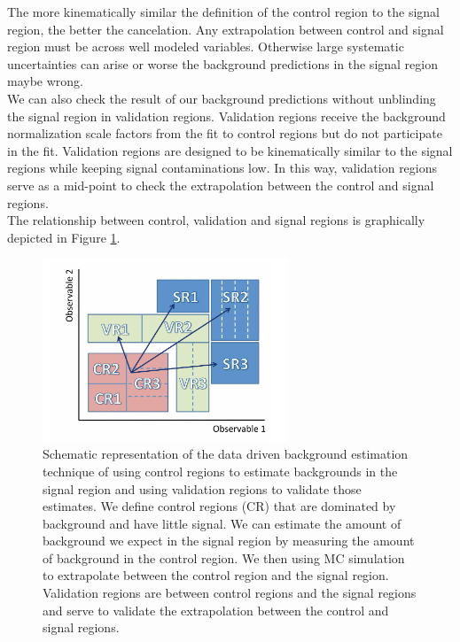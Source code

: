 \indent The more kinematically similar the definition of the control region to the signal region, the better the cancelation.  Any extrapolation between control and signal region must be across well modeled variables.  Otherwise large systematic uncertainties can arise or worse the background predictions in the signal region maybe wrong.  \\

\indent We can also check the result of our background predictions without unblinding the signal region in validation regions.  Validation regions receive the background normalization scale factors from the fit to control regions but do not participate in the fit.   Validation regions are designed to be kinematically similar to the signal regions while keeping signal contaminations low.  In this way, validation regions serve as a mid-point to check the extrapolation between the control and signal regions.  \\

\indent The relationship between control, validation and signal regions is graphically depicted in Figure \ref{fig:CR_VR_SR_stat}. \\

\begin{figure}[h!]
  \centering
	\includegraphics[width=0.65\textwidth]{./figures/statistics/CR_VR_SR.pdf}
\caption[Schematic representation of the relationship between control, validation and signal regions]{Schematic representation of the data driven background estimation technique of using control regions to estimate backgrounds in the signal region and using validation regions to validate those estimates.  We define control regions (CR) that are dominated by background and have little signal.  We can estimate the amount of background we expect in the signal region by measuring the amount of background in the control region.  We then using MC simulation to extrapolate between the control region and the signal region. Validation regions are between control regions and the signal regions and serve to validate the extrapolation between the control and signal regions.  }
\label{fig:CR_VR_SR_stat}
\end{figure}

